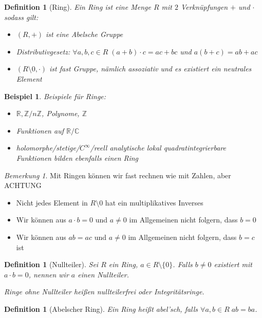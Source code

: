 \documentclass[a4paper,12pt,numbers=noenddot,parskip=full]{scrartcl}
\newcommand{\setZ}{\mathbb{Z}}
\newcommand{\setR}{\mathbb{R}}
\newcommand{\setC}{\mathbb{C}}
\theoremstyle{dotless}
\newtheorem{definition}[theorem]{Definition}
\newtheorem{example}[theorem]{Beispiel}
\theoremstyle{remark}
\newtheorem*{remark}{Bemerkung}
\begin{document}
	\begin{definition}[Ring]
		Ein Ring ist eine Menge $R$ mit $2$ Verknüpfungen $+$ und $\cdot$ sodass gilt:
		\begin{itemize}
			\item $(R,+)$ ist eine Abelsche Gruppe
			\item Distributivgesetz: $\forall a,b,c \in R \; (a+b) \cdot c = ac + bc$ und $a(b+c) = ab + ac$
			\item $(R \setminus 0, \cdot)$ ist fast Gruppe, nämlich assoziativ und es existiert ein neutrales Element
		\end{itemize}
	\end{definition}

	\begin{example}
		Beispiele für Ringe:
		\begin{itemize}
			\item $\setR, \setZ / n\setZ$, Polynome, $\setZ$
			\item Funktionen auf $\setR / \setC$
			\item holomorphe/stetige/$C^\infty$/reell analytische lokal quadratintegrierbare Funktionen bilden ebenfalls einen Ring
		\end{itemize}
	\end{example}

	\begin{remark}
		Mit Ringen können wir fast rechnen wie mit Zahlen, aber ACHTUNG
		\begin{itemize}
			\item Nicht jedes Element in $R \setminus 0$ hat ein multiplikatives Inverses
			\item Wir können aus $a \cdot b = 0$ und $a \neq 0$ im Allgemeinen nicht folgern, dass $b = 0$
			\item Wir können aus $ab = ac$ und $a \neq 0$ im Allgemeinen nicht folgern, dass $b = c$ ist
		\end{itemize}
	\end{remark}

	\begin{definition}[Nullteiler]
		Sei $R$ ein Ring, $a \in R \setminus \{0\}$. Falls $b \neq 0$ existiert mit $a \cdot b = 0$, nennen wir $a$ einen Nullteiler.
		
		Ringe ohne Nullteiler heißen nullteilerfrei oder Integritätsringe.
	\end{definition}

	\begin{definition}[Abelscher Ring]
		Ein Ring heißt abel'sch, falls $\forall a,b \in R \; ab = ba$.
	\end{definition}
\end{document}
